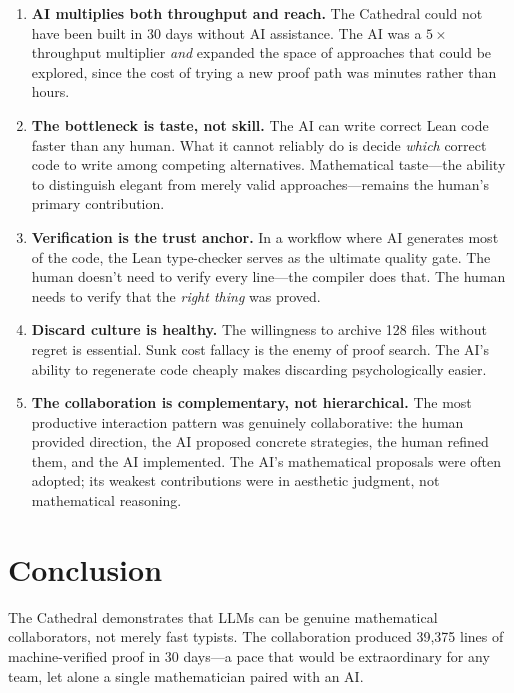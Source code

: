 \documentclass[11pt,a4paper]{article}
\begin{document}
\begin{enumerate}
  \item \textbf{AI multiplies both throughput and reach.} The
    Cathedral could not have been built in 30 days without AI
    assistance. The AI was a $5\times$ throughput multiplier
    \emph{and} expanded the space of approaches that could be
    explored, since the cost of trying a new proof path was
    minutes rather than hours.

  \item \textbf{The bottleneck is taste, not skill.} The AI can
    write correct Lean code faster than any human. What it cannot
    reliably do is decide \emph{which} correct code to write among
    competing alternatives. Mathematical taste---the ability to
    distinguish elegant from merely valid approaches---remains
    the human's primary contribution.

  \item \textbf{Verification is the trust anchor.} In a workflow
    where AI generates most of the code, the Lean type-checker
    serves as the ultimate quality gate. The human doesn't need to
    verify every line---the compiler does that. The human needs to
    verify that the \emph{right thing} was proved.

  \item \textbf{Discard culture is healthy.} The willingness to
    archive 128 files without regret is essential. Sunk cost fallacy
    is the enemy of proof search. The AI's ability to regenerate
    code cheaply makes discarding psychologically easier.

  \item \textbf{The collaboration is complementary, not hierarchical.}
    The most productive interaction pattern was genuinely
    collaborative: the human provided direction, the AI proposed
    concrete strategies, the human refined them, and the AI
    implemented. The AI's mathematical proposals were often adopted;
    its weakest contributions were in aesthetic judgment, not
    mathematical reasoning.
\end{enumerate}

\section{Conclusion}

The Cathedral demonstrates that LLMs can be genuine mathematical
collaborators, not merely fast typists. The collaboration produced
39,375 lines of machine-verified proof in 30 days---a pace that
would be extraordinary for any team, let alone a single
mathematician paired with an AI.
\end{document}
